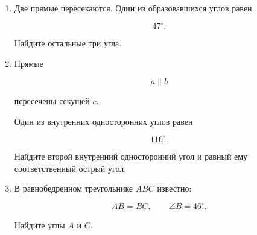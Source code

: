 \documentclass[a4paper,12pt]{article}
\begin{document}
\begin{enumerate}[label=\textbf{\arabic*.}]

\item
Две прямые пересекаются.
Один из образовавшихся углов равен

\[
47^\circ.
\]

Найдите остальные три угла.

\begin{center}


\end{center}

\item
Прямые

\[
a\parallel b
\]

пересечены секущей $c$.

Один из внутренних односторонних углов
равен

\[
116^\circ.
\]

Найдите второй внутренний односторонний угол
и равный ему соответственный острый угол.

\item
В равнобедренном треугольнике $ABC$
известно:

\[
AB=BC,
\qquad
\angle B=46^\circ.
\]

Найдите углы $A$ и $C$.

\begin{center}


\end{center}

\end{enumerate}
\end{document}
